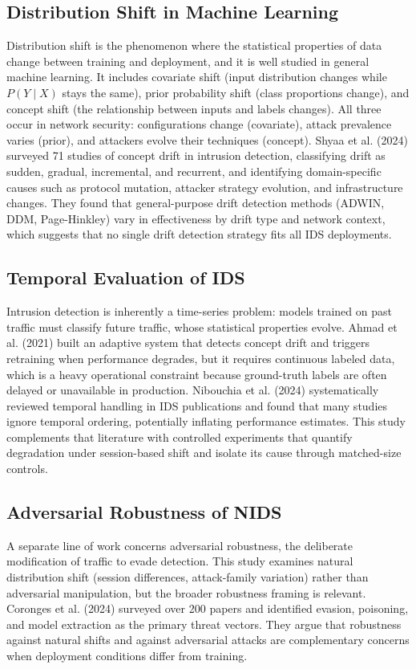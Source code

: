 \documentclass[10pt]{article}
\begin{document}
\subsection{Distribution Shift in Machine Learning}
Distribution shift is the phenomenon where the statistical properties of data change between training and deployment, and it is well studied in general machine learning. It includes covariate shift (input distribution changes while $P(Y \mid X)$ stays the same), prior probability shift (class proportions change), and concept shift (the relationship between inputs and labels changes). All three occur in network security: configurations change (covariate), attack prevalence varies (prior), and attackers evolve their techniques (concept).
Shyaa et al. (2024) surveyed 71 studies of concept drift in intrusion detection, classifying drift as sudden, gradual, incremental, and recurrent, and identifying domain-specific causes such as protocol mutation, attacker strategy evolution, and infrastructure changes. They found that general-purpose drift detection methods (ADWIN, DDM, Page-Hinkley) vary in effectiveness by drift type and network context, which suggests that no single drift detection strategy fits all IDS deployments.
\subsection{Temporal Evaluation of IDS}
Intrusion detection is inherently a time-series problem: models trained on past traffic must classify future traffic, whose statistical properties evolve. Ahmad et al. (2021) built an adaptive system that detects concept drift and triggers retraining when performance degrades, but it requires continuous labeled data, which is a heavy operational constraint because ground-truth labels are often delayed or unavailable in production. Nibouchia et al. (2024) systematically reviewed temporal handling in IDS publications and found that many studies ignore temporal ordering, potentially inflating performance estimates. This study complements that literature with controlled experiments that quantify degradation under session-based shift and isolate its cause through matched-size controls.
\subsection{Adversarial Robustness of NIDS}
A separate line of work concerns adversarial robustness, the deliberate modification of traffic to evade detection. This study examines natural distribution shift (session differences, attack-family variation) rather than adversarial manipulation, but the broader robustness framing is relevant. Coronges et al. (2024) surveyed over 200 papers and identified evasion, poisoning, and model extraction as the primary threat vectors. They argue that robustness against natural shifts and against adversarial attacks are complementary concerns when deployment conditions differ from training.
\end{document}
